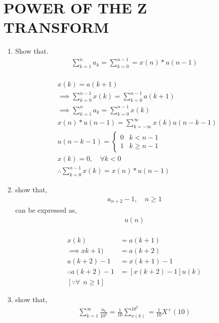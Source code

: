 \documentclass[journal,12pt,twocolumn]{IEEEtran}
\renewcommand\thesection{\arabic{section}}
\begin{document}
\section{POWER OF THE Z TRANSFORM}
\begin{enumerate}[label=\thesection.\arabic*,ref=\thesection.\theenumi]
	
	\item Show that.
		\begin{align}
			\sum_{k=1}^{n} a_k = \sum_{k=0}^{n-1} = x(n) * u(n-1)
		\end{align}
	\solution\\
		\begin{align}
			& x(k) = a(k+1)\\
			& \implies \sum_{k=0}^{n-1} x(k) = \sum_{k=0}^{n-1} a(k+1)\\
			& \implies \sum_{k=1}^{n} a_k = \sum_{k=0}^{n-1} x(k)\\
			& x(n) * u(n-1) = \sum_{k=-\infty}^{\infty} x(k)u(n-k-1)\\
			& u(n-k-1) = 
			\begin{cases}
				0 & k < n-1\\
				1 & k \ge n-1
			\end{cases}\\
			& x(k) = 0, \quad \forall k < 0\\
			& \therefore \sum_{k=0}^{n-1} x(k) = x(n) * u(n-1)
		\end{align}
	
	\item 
		show that,
		\begin{align}
			a_{n+2} -1, \quad n \ge 1
		\end{align}
		can be expressed as,
		\begin{align}
			[x(n+1) -1]u(n)
		\end{align}
	\solution\\
		\begin{align}
			x(k) & = a(k+1) \\ 
			\implies xk+1) & = a(k+2)\\
			a(k+2) -1 & = x(k+1)-1 \\
			\therefore a(k+2)-1 & = [x(k+2)  -1]u(k) \\
			[\because \forall \ \ n \ge 1]
		\end{align}

	\item 
		show that,
		\begin{align}
			\sum_{k=1}^{\infty}\frac{a_k}{10^k} = \frac{1}{10}\sum_{x(k)}^{10^k} = \frac{1}{10}X^+(10)
		\end{align}


\end{enumerate}
\end{document}
